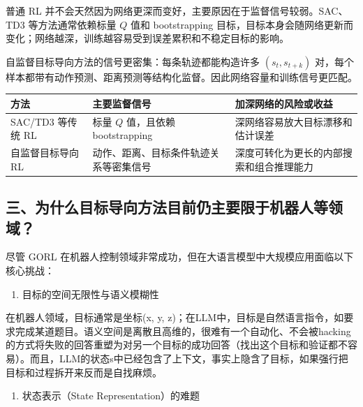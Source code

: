 普通 RL 并不会天然因为网络更深而变好，主要原因在于监督信号较弱。SAC、TD3 等方法通常依赖标量 \(Q\) 值和 bootstrapping 目标，目标本身会随网络更新而变化；网络越深，训练越容易受到误差累积和不稳定目标的影响。

自监督目标导向方法的信号更密集：每条轨迹都能构造许多 \((s_t,s_{t+k})\) 对，每个样本都带有动作预测、距离预测等结构化监督。因此网络容量和训练信号更匹配。

\begin{longtable}[]{@{}lll@{}}
\toprule
方法 & 主要监督信号 & 加深网络的风险或收益 \\
\midrule
\endhead
SAC/TD3 等传统 RL & 标量 \(Q\) 值，且依赖 bootstrapping & 深网络容易放大目标漂移和估计误差 \\
自监督目标导向 RL & 动作、距离、目标条件轨迹关系等密集信号 & 深度可转化为更长的内部搜索和组合推理能力 \\
\bottomrule
\end{longtable}

\hypertarget{ux4e09ux4e3aux4ec0ux4e48ux76eeux6807ux5bfcux5411ux65b9ux6cd5ux76eeux524dux4ecdux4e3bux8981ux9650ux4e8eux673aux5668ux4ebaux7b49ux9886ux57df}{%
\subsection{三、为什么目标导向方法目前仍主要限于机器人等领域？}\label{ux4e09ux4e3aux4ec0ux4e48ux76eeux6807ux5bfcux5411ux65b9ux6cd5ux76eeux524dux4ecdux4e3bux8981ux9650ux4e8eux673aux5668ux4ebaux7b49ux9886ux57df}}

尽管 GORL 在机器人控制领域非常成功，但在大语言模型中大规模应用面临以下核心挑战：

\begin{enumerate}
\def\labelenumi{\arabic{enumi}.}
\tightlist
\item
  目标的空间无限性与语义模糊性
\end{enumerate}

在机器人领域，目标通常是坐标(x, y, z)；在LLM中，目标是自然语言指令，如要求完成某道题目。语义空间是离散且高维的，很难有一个自动化、不会被hacking的方式将失败的回答重塑为对另一个目标的成功回答（找出这个目标和验证都不容易）。而且，LLM的状态s中已经包含了上下文，事实上隐含了目标，如果强行把目标和过程拆开来反而是自找麻烦。

\begin{enumerate}
\def\labelenumi{\arabic{enumi}.}
\setcounter{enumi}{1}
\tightlist
\item
  状态表示（State Representation）的难题
\end{enumerate}

